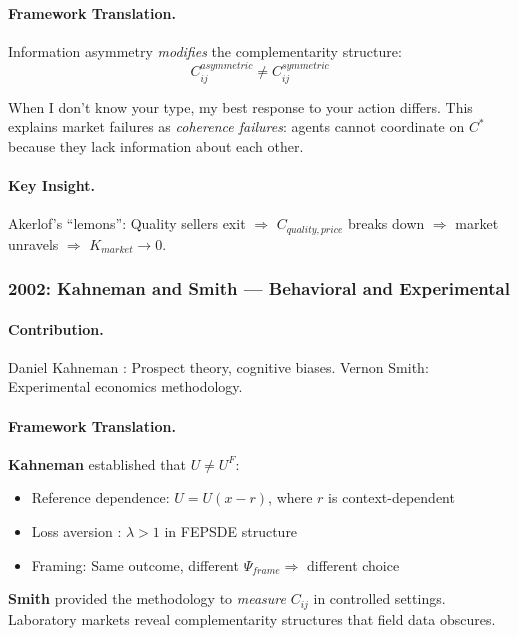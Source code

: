 \documentclass[12pt,a4paper]{article}
\begin{document}
\paragraph{Framework Translation.}
Information asymmetry \emph{modifies} the complementarity structure:
\begin{equation}
  C_{ij}^{asymmetric} \neq C_{ij}^{symmetric}
\end{equation}

When I don't know your type, my best response to your action differs.
This explains market failures as \emph{coherence failures}:
agents cannot coordinate on $C^*$ because they lack information about each other.

\paragraph{Key Insight.}
Akerlof's ``lemons'': Quality sellers exit $\Rightarrow$ $C_{quality, price}$ breaks down
$\Rightarrow$ market unravels $\Rightarrow$ $K_{market} \to 0$.

\subsubsection{2002: Kahneman and Smith --- Behavioral and Experimental}

\paragraph{Contribution.}
Daniel Kahneman \citep{kahneman2011}: Prospect theory, cognitive biases.
Vernon Smith: Experimental economics methodology.

\paragraph{Framework Translation.}
\textbf{Kahneman} established that $U \neq U^F$:
\begin{itemize}
  \item Reference dependence: $U = U(x - r)$, where $r$ is context-dependent
  \item Loss aversion \citep{tverskykahneman1991}: $\lambda > 1$ in FEPSDE structure
  \item Framing: Same outcome, different $\Psi_{frame} \Rightarrow$ different choice
\end{itemize}

\textbf{Smith} provided the methodology to \emph{measure} $C_{ij}$ in controlled settings.
Laboratory markets reveal complementarity structures that field data obscures.
\end{document}
